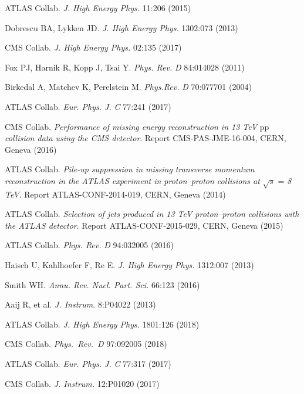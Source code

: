 \documentclass{ar-1col}
\begin{document}
{\begin{thebibliography}{175}
{ATLAS Collab.} \textit{J. High Energy Phys.} 11:206 (2015)

Dobrescu BA, Lykken JD. \textit{J. High Energy Phys.} 1302:073 (2013)

{CMS Collab}. \textit{J. High Energy Phys.} 02:135 (2017)

Fox PJ, Harnik R, Kopp J, Tsai Y. \textit{Phys. Rev.} \textit{D} 84:014028
(2011)

Birkedal A, Matchev K, Perelstein M. \textit{Phys.Rev.} \textit{D} 70:077701
(2004)

{ATLAS Collab.} \textit{Eur. Phys. J.} \textit{C} 77:241 (2017)

{CMS Collab}. \textit{Performance of missing energy reconstruction in 13 TeV }pp \textit{collision data using the CMS detector}.
Report CMS-PAS-JME-16-004, CERN, Geneva (2016)

ATLAS Collab. \textit{Pile-up suppression in missing transverse momentum reconstruction in the ATLAS experiment in proton--proton collisions at} $\sqrt{s}$ = \textit{8 TeV}. Report ATLAS-CONF-2014-019, CERN, Geneva (2014)

ATLAS Collab. \textit{Selection of jets produced in 13 TeV proton--proton collisions with the ATLAS detector}.
Report ATLAS-CONF-2015-029, CERN, Geneva (2015)

{ATLAS Collab.} \textit{Phys. Rev.} \textit{D} 94:032005 (2016)

Haisch U, Kahlhoefer F, Re E. \textit{J. High Energy Phys.} 1312:007 (2013)

Smith WH. \textit{Annu. Rev. Nucl. Part. Sci.} 66:123 (2016)


Aaij R, {et al.} \textit{J. Instrum}. {8}:P04022 (2013)

{ATLAS Collab.} \textit{J. High Energy Phys.} {1801}:126 (2018)

{CMS Collab.} \textit{Phys.\ Rev.\ D} {97}:092005 (2018)

{ATLAS Collab}.  \textit{Eur. Phys. J.} \textit{C} 77:317 (2017)

CMS Collab. \textit{J. Instrum.} 12:P01020 (2017)




\end{thebibliography}}
\end{document}
